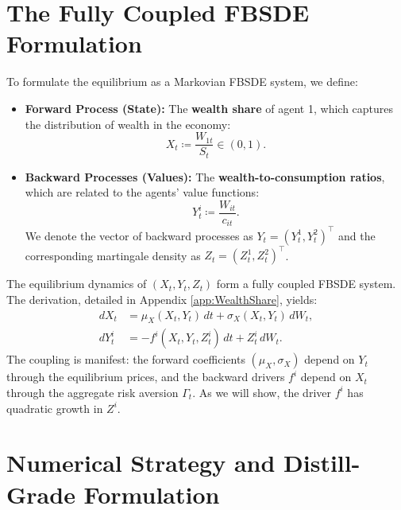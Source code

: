 \section{The Fully Coupled FBSDE Formulation}
\label{sec:GE_FBSDE_new}

\begin{definition}
To formulate the equilibrium as a Markovian FBSDE system, we define:
\begin{itemize}
    \item \textbf{Forward Process (State):} The \textbf{wealth share} of agent 1, which captures the distribution of wealth in the economy:
    \begin{equation}\label{eq:wealth_share_def_new_main}
      X_t \coloneqq \frac{W_{1t}}{S_t} \in (0,1).
    \end{equation}
    \item \textbf{Backward Processes (Values):} The \textbf{wealth-to-consumption ratios}, which are related to the agents' value functions:
    \begin{equation}\label{eq:WC_ratio_def_new_main}
        Y^i_t \coloneqq \frac{W_{it}}{c_{it}}.
    \end{equation}
    We denote the vector of backward processes as \(Y_t = (Y^1_t, Y^2_t)^\top\) and the corresponding martingale density as \(Z_t = (Z^1_t, Z^2_t)^\top\).
\end{itemize}
\end{definition}

\begin{proposition}
The equilibrium dynamics of \((X_t, Y_t, Z_t)\) form a fully coupled FBSDE system. The derivation, detailed in Appendix \ref{app:WealthShare}, yields:
\begin{align}
  dX_t &= \mu_X(X_t, Y_t)\,dt + \sigma_X(X_t, Y_t)\,dW_t, \label{eq:wealth_share_SDE_new_main} \\
  dY^i_t &= -f^i(X_t, Y_t, Z^i_t)\,dt + Z^i_t\,dW_t. \label{eq:BSDE_Y_i_new_main}
\end{align}
The coupling is manifest: the forward coefficients \((\mu_X, \sigma_X)\) depend on \(Y_t\) through the equilibrium prices, and the backward drivers \(f^i\) depend on \(X_t\) through the aggregate risk aversion \(\Gamma_t\). As we will show, the driver $f^i$ has quadratic growth in $Z^i$.
\end{proposition}

\section{Numerical Strategy and Distill-Grade Formulation}
\label{sec:GE_numerical_strategy_new}


